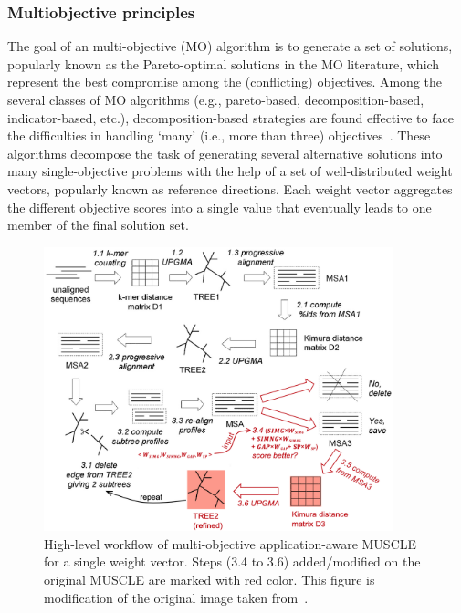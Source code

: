 \subsubsection{Multiobjective principles}
The goal of an multi-objective (MO) algorithm is to generate a set of solutions, popularly known as the Pareto-optimal solutions in the MO literature, which represent the best compromise among the (conflicting) objectives. 
Among the several classes of MO algorithms (e.g., pareto-based, decomposition-based, indicator-based, etc.), decomposition-based strategies are found effective to face the difficulties in handling `many' (i.e., more than three) objectives~\cite{li2015many}. These algorithms decompose the task of generating several alternative solutions into many single-objective problems with the help of a set of well-distributed weight vectors, popularly known as reference directions. Each weight vector aggregates the different objective scores into a single value that eventually leads to one member of the final solution set.

\begin{figure}[!htbp]
	\centering
	\includegraphics[width=0.9\textwidth]{Figure/ma-muscle}
	\caption{High-level workflow of multi-objective application-aware MUSCLE for a single weight vector. Steps (3.4 to 3.6) added/modified on the original MUSCLE are marked with red color. This figure is modification of the original image taken from~\cite{edgar2004muscle}.}
	\label{fig:ma-muscle}
\end{figure}

